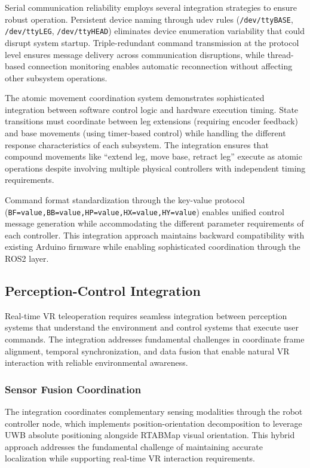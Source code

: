 Serial communication reliability employs several integration strategies to ensure robust operation. Persistent device naming through udev rules (\texttt{/dev/ttyBASE}, \texttt{/dev/ttyLEG}, \texttt{/dev/ttyHEAD}) eliminates device enumeration variability that could disrupt system startup. Triple-redundant command transmission at the protocol level ensures message delivery across communication disruptions, while thread-based connection monitoring enables automatic reconnection without affecting other subsystem operations.

The atomic movement coordination system demonstrates sophisticated integration between software control logic and hardware execution timing. State transitions must coordinate between leg extensions (requiring encoder feedback) and base movements (using timer-based control) while handling the different response characteristics of each subsystem. The integration ensures that compound movements like ``extend leg, move base, retract leg'' execute as atomic operations despite involving multiple physical controllers with independent timing requirements.

Command format standardization through the key-value protocol (\texttt{BF=value,BB=value,HP=value,HX=value,HY=value}) enables unified control message generation while accommodating the different parameter requirements of each controller. This integration approach maintains backward compatibility with existing Arduino firmware while enabling sophisticated coordination through the ROS2 layer.

\subsection{Perception-Control Integration}

Real-time VR teleoperation requires seamless integration between perception systems that understand the environment and control systems that execute user commands. The integration addresses fundamental challenges in coordinate frame alignment, temporal synchronization, and data fusion that enable natural VR interaction with reliable environmental awareness.

\subsubsection{Sensor Fusion Coordination}

The integration coordinates complementary sensing modalities through the robot controller node, which implements position-orientation decomposition to leverage UWB absolute positioning alongside RTABMap visual orientation. This hybrid approach addresses the fundamental challenge of maintaining accurate localization while supporting real-time VR interaction requirements.

